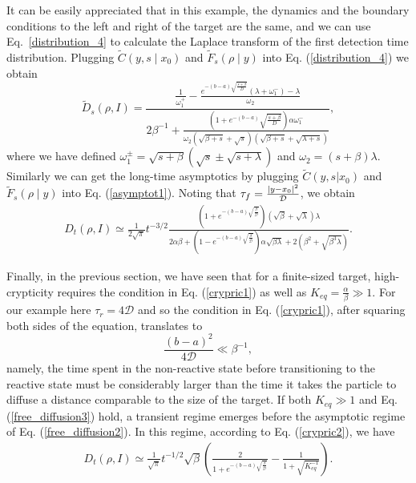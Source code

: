 It can be easily appreciated that in this example, the dynamics and the boundary conditions to the left and right of the target are the same, and we can use Eq.~\eqref{distribution_4} to calculate the Laplace transform of the first detection time distribution. Plugging $\widetilde{C}(y, s \mid x_{0})$ and $\widetilde{F}_s(\rho \mid y)$ into Eq. (\ref{distribution_4}) we obtain
%
\begin{equation} \label{diffusion1}
 \widetilde{D}_s(\rho, I) =   \frac{\frac{1}{\omega^{+}_{1}}-\frac{e^{-(b-a) \sqrt{\frac{s+\beta}{D}}}\left(\lambda+\omega^{-}_{1} \right)-\lambda}{\omega_2}}{2\beta^{-1} +\frac{\left(1+e^{-(b-a)} \sqrt{\frac{s+\beta}{D}}\right) \alpha \omega^{-}_{1}}{\omega_2 \left(\sqrt{\beta +s}+\sqrt{s}\right) \left(\sqrt{\beta +s}+\sqrt{\lambda +s}\right)}},    
\end{equation}
%
where we have defined $\omega^{\pm}_{1}=\sqrt{s+\beta}(\sqrt{s} \pm \sqrt{s+\lambda})$ and $\omega_2=(s+\beta) \lambda$. Similarly we can get the long-time asymptotics by plugging $\widetilde{C}(y, s | x_{0})$ and $\widetilde{F}_s(\rho \mid y)$ into  Eq. (\ref{asymptot1}). Noting that $\tau_f = \frac{\vert{y-x_0}\vert^2}{\mathcal{D}}$, we obtain
%
\begin{align} \label{free_diffusion2}
 D_t(\rho, I) \simeq \frac{1}{2 \sqrt{\pi}} t^{-3/2}   \frac{\left(1+e^{-(b-a) \sqrt{\frac{\beta}{\mathcal{D}}}}\right)(\sqrt{\beta}+\sqrt{\lambda}) \lambda}{2 \alpha \beta+\left(1-e^{-(b-a) \sqrt{\frac{\beta}{\mathcal{D}}}}\right) \alpha \sqrt{\beta \lambda}+2\left(\beta^{2}+\sqrt{\beta^{3} \lambda}\right)}. 
\end{align}

Finally, in the previous section, we have seen that for a finite-sized target, high-crypticity requires the condition in Eq. (\ref{crypric1}) as well as $K_{eq} = \frac{\alpha}{\beta} \gg 1$. For our example here $\tau_r = 4 \mathcal{D}$ and so the condition in Eq. (\ref{crypric1}), after squaring both sides of the equation, translates to
%
\begin{equation} \label{free_diffusion3}
 \frac{(b-a)^2}{4 \mathcal{D}} \ll \beta^{-1} ,
\end{equation}
%
namely, the time spent in the non-reactive state before transitioning to the reactive state must be considerably larger than the time it takes the particle to diffuse a distance comparable to the size of the target. If both $K_{eq} \gg 1$ and Eq. (\ref{free_diffusion3}) hold, a transient regime emerges before the asymptotic regime of Eq. (\ref{free_diffusion2}). In this regime, according to Eq. (\ref{crypric2}), we have
%
\begin{align} \label{free_diffusion4}
 D_t(\rho, I) \simeq  \frac{1}{\sqrt{\pi}} t^{-1/2} 
\sqrt{\beta}\left(\frac{2}{1+e^{-(b-a) \sqrt{\frac{\beta}{\mathcal{D}}}}}-\frac{1}{1+\sqrt{K^{-1}_{eq}}}\right)   .
\end{align}


